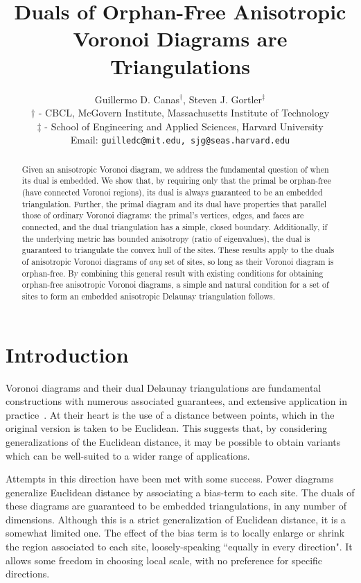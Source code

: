 \documentclass[11pt]{article}
\title{Duals of Orphan-Free Anisotropic Voronoi Diagrams are Triangulations}
\author{Guillermo D. Canas$^{\dagger}$,   Steven J. Gortler$^{\ddagger}$ \\
\small  $\dagger$ - CBCL, McGovern Institute,  
Massachusetts Institute of Technology\\
\small  $\ddagger$ - School of Engineering and Applied Sciences, 
Harvard University\\
\small Email:  \tt guilledc@mit.edu, sjg@seas.harvard.edu}
\date{}
\begin{document}
\maketitle

\begin{abstract}
Given an anisotropic Voronoi diagram, we address the fundamental question of when its dual is embedded. 
We show that, by requiring only that the primal be orphan-free (have connected Voronoi regions), 
its dual is always guaranteed to be an embedded triangulation. 
Further, the primal  diagram and its dual have properties that parallel those of ordinary Voronoi diagrams:
the primal's vertices, edges, and faces are connected, and the dual triangulation has a simple, closed boundary. 
Additionally, if the underlying metric has bounded anisotropy (ratio of eigenvalues), the dual is guaranteed to triangulate the convex hull of the sites.   
These results apply to the duals of anisotropic Voronoi diagrams of \emph{any}
set of sites, so long as their Voronoi diagram is orphan-free. 
By combining this general result with existing conditions for obtaining orphan-free anisotropic Voronoi diagrams, 
a simple and natural condition for a set of sites to form an embedded anisotropic Delaunay triangulation follows. 
\end{abstract}

\newpage

\section{Introduction}

Voronoi diagrams and their dual Delaunay triangulations are fundamental constructions with
numerous associated guarantees, and extensive application in
practice~\cite{Delaunay1934,Edelsbrunner}. 
At their heart is the use of a distance between points, which in the original
version is taken to be Euclidean. 
This suggests that, by considering generalizations of the Euclidean
distance, it may be possible to obtain variants which can be well-suited to
a wider range of applications.  

Attempts in this direction have been met with some success. 
Power diagrams~\cite{power} generalize Euclidean distance by associating a {bias-term} to each site. The duals of these diagrams
are guaranteed to be embedded triangulations, in any number of
dimensions. 
Although this is a strict generalization of Euclidean distance, it is a somewhat 
limited one. The effect of the bias term is to locally enlarge or shrink the
region associated to each site, loosely-speaking ``equally in every
direction". It allows some freedom in choosing local scale, with no
preference for specific directions. 
\end{document}
